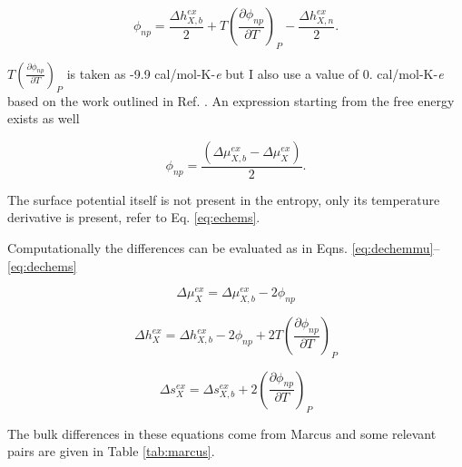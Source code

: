 \begin{cpa}
  \begin{equation}
    \phi_{np}  = \frac{\Delta h_{X,b}^{ex}}{2}  + T\left(\frac{\partial \phi_{np}}{\partial T}\right)_P - \frac{\Delta h_{X,n}^{ex}}{2}.
    \label{eq:netpot2}
  \end{equation}
  
  \noindent $T\left(\frac{\partial \phi_{np}}{\partial T}\right)_P$ is taken as -9.9 cal/mol-K-\emph{e}\cite{randles1977structure} but I also use a value of
  0. cal/mol-K-\emph{e} based on the work outlined in Ref. \cite{pollard2014cpa1}. An expression starting from the free energy exists as well
  
  \begin{equation}
    \phi_{np} = \frac{(\Delta \mu_{X,b}^{ex} - \Delta \mu_X^{ex})}{2}.
    \label{eq:netpot1}
  \end{equation}

  \noindent The surface potential itself is not present in the entropy, only its temperature derivative is present, refer to Eq. \ref{eq:echems}.
  
  Computationally the differences can be evaluated as in Eqns. \ref{eq:dechemmu}--\ref{eq:dechems}
  
  \begin{equation}
    \Delta \mu_X^{ex} = \Delta \mu_{X,b}^{ex} - 2\phi_{np}
    \label{eq:dechemmu}
  \end{equation}

  \begin{equation}
    \Delta h_X^{ex} = \Delta h_{X,b}^{ex} - 2\phi_{np} + 2T\left(\frac{\partial \phi_{np}}{\partial T}\right)_P
    \label{eq:dechemh}
  \end{equation}

  \begin{equation}
    \Delta s_X^{ex} = \Delta s_{X,b}^{ex} + 2\left(\frac{\partial \phi_{np}}{\partial T}\right)_P
    \label{eq:dechems}
  \end{equation}
  
  \noindent The bulk differences in these equations come from Marcus\cite{marcus1985book} and some relevant pairs are given in Table \ref{tab:marcus}.


\end{cpa}
